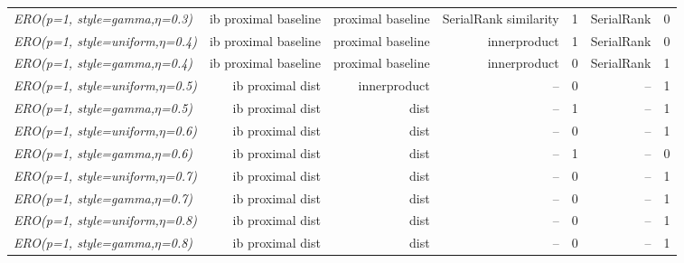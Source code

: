\documentclass[nohyperref]{article}
\theoremstyle{plain}
\theoremstyle{definition}
\theoremstyle{remark}
\begin{document}
\begin{table*}[!ht]
{\begin{tabular}{lrrrrrr}
			{\it ERO(p=1, style=gamma,$\eta$=0.3)} & ib proximal baseline & proximal baseline & SerialRank similarity & 1 & SerialRank & 0 \\
			{\it ERO(p=1, style=uniform,$\eta$=0.4)} & ib proximal baseline & proximal baseline & innerproduct & 1 & SerialRank & 0 \\
			{\it ERO(p=1, style=gamma,$\eta$=0.4)} & ib proximal baseline & proximal baseline & innerproduct & 0 & SerialRank & 1 \\
			{\it ERO(p=1, style=uniform,$\eta$=0.5)} & ib proximal dist & innerproduct & -- & 0 & -- & 1 \\
			{\it ERO(p=1, style=gamma,$\eta$=0.5)} & ib proximal dist & dist & -- & 1 & -- & 1 \\
			{\it ERO(p=1, style=uniform,$\eta$=0.6)} & ib proximal dist & dist & -- & 0 & -- & 1 \\
			{\it ERO(p=1, style=gamma,$\eta$=0.6)} & ib proximal dist & dist & -- & 1 & -- & 0 \\
			{\it ERO(p=1, style=uniform,$\eta$=0.7)} & ib proximal dist & dist & -- & 0 & -- & 1 \\
			{\it ERO(p=1, style=gamma,$\eta$=0.7)} & ib proximal dist & dist & -- & 0 & -- & 1 \\
			{\it ERO(p=1, style=uniform,$\eta$=0.8)} & ib proximal dist & dist & -- & 0 & -- & 1 \\
			{\it ERO(p=1, style=gamma,$\eta$=0.8)} & ib proximal dist & dist & -- & 0 & -- & 1 \\
\bottomrule
\end{tabular}}
\end{table*}
\end{document}
